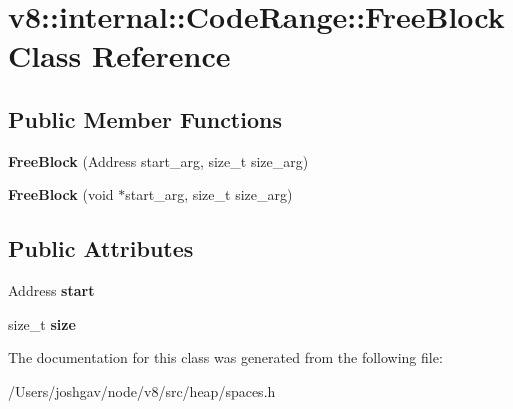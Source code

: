 \hypertarget{classv8_1_1internal_1_1_code_range_1_1_free_block}{}\section{v8\+:\+:internal\+:\+:Code\+Range\+:\+:Free\+Block Class Reference}
\label{classv8_1_1internal_1_1_code_range_1_1_free_block}
\subsection*{Public Member Functions}
\begin{DoxyCompactItemize}
\item 
{\bfseries Free\+Block} (Address start\+\_\+arg, size\+\_\+t size\+\_\+arg)\hypertarget{classv8_1_1internal_1_1_code_range_1_1_free_block_a5c6148a54f6a2325d0bd640cba27edaa}{}\label{classv8_1_1internal_1_1_code_range_1_1_free_block_a5c6148a54f6a2325d0bd640cba27edaa}

\item 
{\bfseries Free\+Block} (void $\ast$start\+\_\+arg, size\+\_\+t size\+\_\+arg)\hypertarget{classv8_1_1internal_1_1_code_range_1_1_free_block_ac2df78b0ac33102b16cc1dac2361e3ac}{}\label{classv8_1_1internal_1_1_code_range_1_1_free_block_ac2df78b0ac33102b16cc1dac2361e3ac}

\end{DoxyCompactItemize}
\subsection*{Public Attributes}
\begin{DoxyCompactItemize}
\item 
Address {\bfseries start}\hypertarget{classv8_1_1internal_1_1_code_range_1_1_free_block_ab506f93b727bab7b3528418c9bc1ba0d}{}\label{classv8_1_1internal_1_1_code_range_1_1_free_block_ab506f93b727bab7b3528418c9bc1ba0d}

\item 
size\+\_\+t {\bfseries size}\hypertarget{classv8_1_1internal_1_1_code_range_1_1_free_block_af0ec7869dd0c2eb47b6f189d95481af8}{}\label{classv8_1_1internal_1_1_code_range_1_1_free_block_af0ec7869dd0c2eb47b6f189d95481af8}

\end{DoxyCompactItemize}


The documentation for this class was generated from the following file\+:\begin{DoxyCompactItemize}
\item 
/\+Users/joshgav/node/v8/src/heap/spaces.\+h\end{DoxyCompactItemize}
